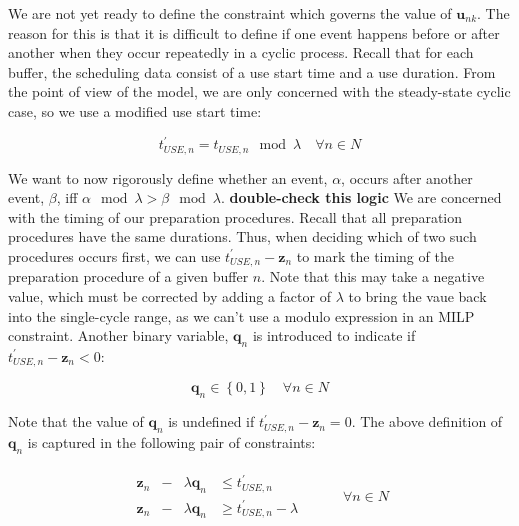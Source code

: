 We are not yet ready to define the constraint which governs the value of
$\boldsymbol{u}_{nk}$.
The reason for this is that it is difficult to define if one event happens
before or after another when they occur repeatedly in a cyclic process.
Recall that for each buffer, the scheduling data consist of a use start time
and a use duration.
From the point of view of the model, we are only concerned with the 
steady-state cyclic case, so we use a modified use start time:

\begin{equation}
    t_{USE,n}^{\prime} = t_{USE,n} \mod \lambda \quad \forall n \in N
\end{equation}

We want to now rigorously define whether an event, $\alpha$, occurs after
another event, $\beta$, iff $ \alpha \mod \lambda > \beta \mod \lambda $.
\textbf{double-check this logic}
We are concerned with the timing of our preparation procedures.
Recall that all preparation procedures have the same durations.
Thus, when deciding which of two such procedures occurs first, we can use 
$ t_{USE,n}^{\prime} - \boldsymbol{z}_{n} $ to mark the timing of the
preparation procedure of a given buffer $n$.
Note that this may take a negative value, which must be corrected by adding a
factor of $\lambda$ to bring the vaue back into the single-cycle range, as we
can't use a modulo expression in an MILP constraint.
Another binary variable, $ \boldsymbol{q}_{n} $ is introduced to indicate if
$ t_{USE,n}^{\prime} - \boldsymbol{z}_{n} < 0 $:
 
\begin{equation}
    \boldsymbol{q}_{n} \in \left\{ 0, 1 \right\} \quad \forall n \in N
    \label{eq.q}
\end{equation}

Note that the value of $ \boldsymbol{q}_{n} $ is undefined if 
$ t_{USE,n}^{\prime} - \boldsymbol{z}_{n} = 0 $.
The above definition of $ \boldsymbol{q}_{n} $ is captured in the following
pair of constraints:

\begin{equation}
    \begin{split}
        \begin{alignedat}{2}
            \boldsymbol{z}_{n} & {}-{} & \lambda \boldsymbol{q}_{n} & \le 
            t_{USE,n}^{\prime}\\
            \boldsymbol{z}_{n} & {}-{} & \lambda \boldsymbol{q}_{n} & \ge 
            t_{USE,n}^{\prime} - \lambda
        \end{alignedat}
    \end{split}
    \quad\quad
    \begin{split}
        \forall n \in N
    \end{split}
    \label{eq.constr8a}
\end{equation}

